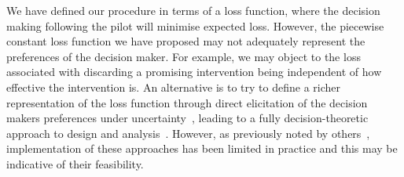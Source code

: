 \documentclass[AMA,STIX1COL]{WileyNJD-v2}
\begin{document}
We have defined our procedure in terms of a loss function, where the decision making following the pilot will minimise expected loss. However, the piecewise constant loss function we have proposed may not adequately represent the preferences of the decision maker. For example, we may object to the loss associated with discarding a promising intervention being independent of how effective the intervention is. An alternative is to try to define a richer representation of the loss function through direct elicitation of the decision makers preferences under uncertainty~\cite{French2000}, leading to a fully decision-theoretic approach to design and analysis~\cite{Lindley1997}. However, as previously noted by others~\cite{Joseph1997a, Bacchetti2008, Whitehead2008}, implementation of these approaches has been limited in practice and this may be indicative of their feasibility.




\end{document}
